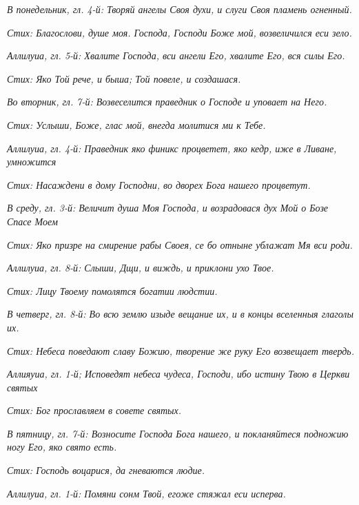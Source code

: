 

\itshape В понедельник, гл. 4-й:\normalfont{} Творяй ангелы Своя духи, и слуги Своя пламень огненный.


\itshape Стих:\normalfont{} Благослови, душе моя. Господа, Господи Боже мой, возвеличился еси зело.


\itshape Аллилуиа, гл. 5-й:\normalfont{} Хвалите Господа, вси ангели Его, хвалите Его, вся силы Его.


\itshape Стих:\normalfont{} Яко Той рече, и быша; Той повеле, и создашася.


\itshape Во вторник, гл. 7-й:\normalfont{} Возвеселится праведник о Господе и уповает на Него.


\itshape Стих:\normalfont{} Услыши, Боже, глас мой, внегда молитися ми к Тебе.


\itshape Аллилуиа, гл. 4-й:\normalfont{} Праведник яко финикс процветет, яко кедр, иже в Ливане, умножится


\itshape Стих:\normalfont{} Насаждени в дому Господни, во дворех Бога нашего процветут.


\itshape В сред\normalfont{}у\itshape , гл. 3-й:\normalfont{} Величит душа Моя Господа, и возрадовася дух Мой о Бозе Спасе Моем


\itshape Стих:\normalfont{} Яко призре на смирение рабы Своея, се бо отныне ублажат Мя вси роди.


\itshape Аллилуиа, гл. 8-й:\normalfont{} Слыши, Дщи, и виждь, и приклони ухо Твое.


\itshape Стих:\normalfont{} Лицу Твоему помолятся богатии людстии.


\itshape В четверг, гл. 8-й:\normalfont{} Во всю землю изыде вещание их, и в концы вселенныя глаголы их.


\itshape Стих:\normalfont{} Небеса поведают славу Божию, творение же руку Его возвещает твердь.


\itshape Аллияуиа, гл. 1-й;\normalfont{} Исповедят небеса чудеса, Господи, ибо истину Твою в Церкви святых


\itshape Стих:\normalfont{} Бог прославляем в совете святых.


\itshape В пятницу, гл. 7-й:\normalfont{} Возносите Господа Бога нашего, и покланяйтеся подножию ногу Его, яко свято есть.


\itshape Стих:\normalfont{} Господь воцарися, да гневаются людие.


\itshape Аллилуиа, гл. 1-й:\normalfont{} Помяни сонм Твой, егоже стяжал еси исперва.


